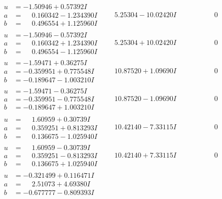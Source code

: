 \documentclass[1p]{elsarticle_modified}
\theoremstyle{definition}
\begin{document}
$$\begin{array}{c|c|c}
\begin{aligned}
u &= -1.50946 + 0.57392 I \\
a &= \phantom{-}0.160342 - 1.234390 I \\
b &= \phantom{-}0.496554 + 1.125960 I\end{aligned}
 & \phantom{-}5.25304 - 10.02420 I & \phantom{-0.000000 } 0 \\ \hline\begin{aligned}
u &= -1.50946 - 0.57392 I \\
a &= \phantom{-}0.160342 + 1.234390 I \\
b &= \phantom{-}0.496554 - 1.125960 I\end{aligned}
 & \phantom{-}5.25304 + 10.02420 I & \phantom{-0.000000 } 0 \\ \hline\begin{aligned}
u &= -1.59471 + 0.36275 I \\
a &= -0.359951 + 0.775548 I \\
b &= -0.189647 - 1.003210 I\end{aligned}
 & \phantom{-}10.87520 + 1.09690 I & \phantom{-0.000000 } 0 \\ \hline\begin{aligned}
u &= -1.59471 - 0.36275 I \\
a &= -0.359951 - 0.775548 I \\
b &= -0.189647 + 1.003210 I\end{aligned}
 & \phantom{-}10.87520 - 1.09690 I & \phantom{-0.000000 } 0 \\ \hline\begin{aligned}
u &= \phantom{-}1.60959 + 0.30739 I \\
a &= \phantom{-}0.359251 + 0.813293 I \\
b &= \phantom{-}0.136675 - 1.025940 I\end{aligned}
 & \phantom{-}10.42140 - 7.33115 I & \phantom{-0.000000 } 0 \\ \hline\begin{aligned}
u &= \phantom{-}1.60959 - 0.30739 I \\
a &= \phantom{-}0.359251 - 0.813293 I \\
b &= \phantom{-}0.136675 + 1.025940 I\end{aligned}
 & \phantom{-}10.42140 + 7.33115 I & \phantom{-0.000000 } 0 \\ \hline\begin{aligned}
u &= -0.321499 + 0.116471 I \\
a &= \phantom{-}2.51073 + 4.69380 I \\
b &= -0.677777 - 0.809393 I\end{aligned}

\end{array}$$
\end{document}
